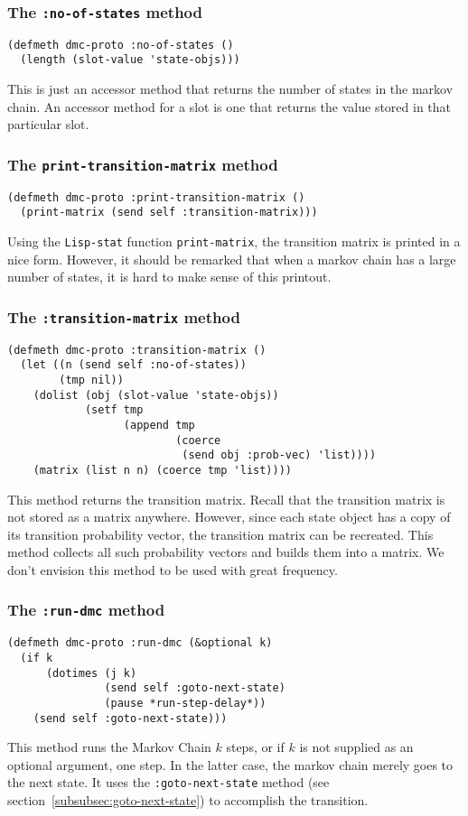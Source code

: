 \subsubsection{The {\tt :no-of-states} method}
\label{subsubsec:no-of-states}
\begin{verbatim}
(defmeth dmc-proto :no-of-states ()
  (length (slot-value 'state-objs)))
\end{verbatim}
This is just an accessor method that returns the number of states in
the markov chain. An accessor method for a slot is one that returns
the value stored in that particular slot. 

\subsubsection{The {\tt print-transition-matrix} method}
\label{subsubsec:print-transition-matrix}
\begin{verbatim}
(defmeth dmc-proto :print-transition-matrix ()
  (print-matrix (send self :transition-matrix)))
\end{verbatim}
Using the {\tt Lisp-stat} function {\tt print-matrix}, the transition
matrix is printed in a nice form.  However, it should be remarked that
when a markov chain has a large number of states, it is hard to make
sense of this printout. 

\subsubsection{The {\tt :transition-matrix} method}
\label{subsubsec:transition-matrix}
\begin{verbatim}
(defmeth dmc-proto :transition-matrix ()
  (let ((n (send self :no-of-states))
        (tmp nil))
    (dolist (obj (slot-value 'state-objs))
            (setf tmp 
                  (append tmp 
                          (coerce 
                           (send obj :prob-vec) 'list))))
    (matrix (list n n) (coerce tmp 'list))))
\end{verbatim}
This method returns the transition matrix.  Recall that the transition
matrix is not stored as a matrix anywhere.  However, since each state
object has a copy of its transition probability vector, the transition
matrix can be recreated.  This method collects all such probability
vectors and builds them into a matrix.  We don't envision this method
to be used with great frequency. 

\subsubsection{The {\tt :run-dmc} method}
\label{subsubsec:run-dmc}
\begin{verbatim}
(defmeth dmc-proto :run-dmc (&optional k)
  (if k
      (dotimes (j k)
               (send self :goto-next-state)
               (pause *run-step-delay*))
    (send self :goto-next-state)))
\end{verbatim}
This method runs the Markov Chain $k$ steps, or if $k$ is not supplied
as an optional argument, one step.  In the latter case, the markov chain
merely goes to the next state. It uses the {\tt :goto-next-state}
method (see section~\ref{subsubsec:goto-next-state}) to accomplish the
transition.  

